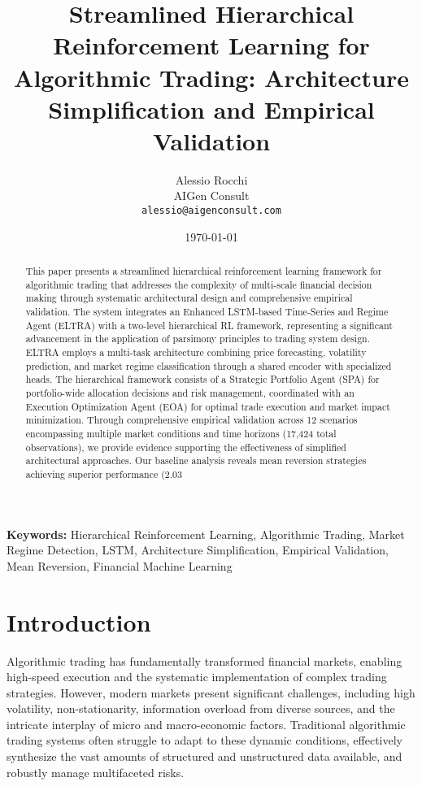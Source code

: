 \documentclass[11pt,a4paper]{article}
\title{Streamlined Hierarchical Reinforcement Learning for Algorithmic Trading: Architecture Simplification and Empirical Validation}
\author{Alessio Rocchi\\
AIGen Consult\\
\texttt{alessio@aigenconsult.com}}
\date{\today}
\begin{document}
\maketitle

\begin{abstract}
This paper presents a streamlined hierarchical reinforcement learning framework for algorithmic trading that addresses the complexity of multi-scale financial decision making through systematic architectural design and comprehensive empirical validation. The system integrates an Enhanced LSTM-based Time-Series and Regime Agent (ELTRA) with a two-level hierarchical RL framework, representing a significant advancement in the application of parsimony principles to trading system design. ELTRA employs a multi-task architecture combining price forecasting, volatility prediction, and market regime classification through a shared encoder with specialized heads. The hierarchical framework consists of a Strategic Portfolio Agent (SPA) for portfolio-wide allocation decisions and risk management, coordinated with an Execution Optimization Agent (EOA) for optimal trade execution and market impact minimization. Through comprehensive empirical validation across 12 scenarios encompassing multiple market conditions and time horizons (17,424 total observations), we provide evidence supporting the effectiveness of simplified architectural approaches. Our baseline analysis reveals mean reversion strategies achieving superior performance (2.03%
\end{abstract}

\textbf{Keywords:} Hierarchical Reinforcement Learning, Algorithmic Trading, Market Regime Detection, LSTM, Architecture Simplification, Empirical Validation, Mean Reversion, Financial Machine Learning


\section{Introduction}

Algorithmic trading has fundamentally transformed financial markets, enabling high-speed execution and the systematic implementation of complex trading strategies. However, modern markets present significant challenges, including high volatility, non-stationarity, information overload from diverse sources, and the intricate interplay of micro and macro-economic factors. Traditional algorithmic trading systems often struggle to adapt to these dynamic conditions, effectively synthesize the vast amounts of structured and unstructured data available, and robustly manage multifaceted risks.
\end{document}
